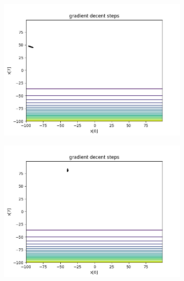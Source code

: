 	\begin{figure}[h!]
		\centering
		\begin{subfigure}[b]{0.45\linewidth}
			\includegraphics[width=\linewidth]{photos/f2_1_1.png}
		\end{subfigure}
		\begin{subfigure}[b]{0.45\linewidth}
			\includegraphics[width=\linewidth]{photos/f2_2_1.png}
		\end{subfigure}
		\begin{subfigure}[b]{0.45\linewidth}

\end{subfigure}
\end{figure}

